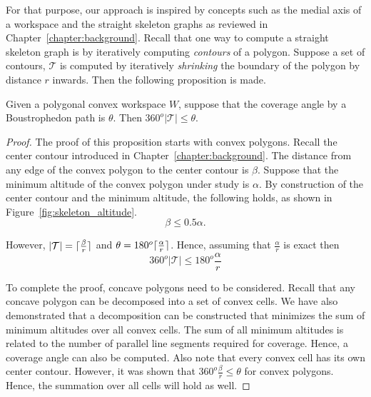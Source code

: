 \documentclass[../main.tex]{subfiles}
\begin{document}
For that purpose, our approach is inspired by concepts such as the medial axis of a workspace and the straight skeleton graphs as reviewed in Chapter~\ref{chapter:background}. Recall that one way to compute a straight skeleton graph is by iteratively computing \emph{contours} of a polygon. Suppose a set of contours, $\mathcal{T}$ is computed by iteratively \emph{shrinking} the boundary of the polygon by distance $r$ inwards. Then the following proposition is made.

\begin{proposition}
	Given a polygonal convex workspace $W$, suppose that the coverage angle by a Boustrophedon path is $\theta$. Then $360^o|\mathcal{T}|\leq\theta$.
\end{proposition}
\begin{proof}

The proof of this proposition starts with convex polygons. Recall the center contour introduced in Chapter~\ref{chapter:background}. The distance from any edge of the convex polygon to the center contour is $\beta$. Suppose that the minimum altitude of the convex polygon under study is $\alpha$. By construction of the center contour and the minimum altitude, the following holds, as shown in Figure~\ref{fig:skeleton_altitude}.
\begin{equation}
	\beta\leq 0.5\alpha.
\end{equation}

However, $|\mathcal{T}|=\lceil\frac{\beta}{r}\rceil$ and $\theta=180^o\lceil\frac{\alpha}{r}\rceil$. Hence, assuming that $\frac{\alpha}{r}$ is exact then
\begin{equation}
 360^o|\mathcal{T}|\leq180^o\frac{\alpha}{r}
 \end{equation}

To complete the proof, concave polygons need to be considered. Recall that any concave polygon can be decomposed into a set of convex cells. We have also demonstrated that a decomposition can be constructed that minimizes the sum of minimum altitudes over all convex cells. The sum of all minimum altitudes is related to the number of parallel line segments required for coverage. Hence, a coverage angle can also be computed. Also note that every convex cell has its own center contour. However, it was shown that $360^o\frac{\beta}{r}\leq\theta$ for convex polygons. Hence, the summation over all cells will hold as well.
\end{proof}
\end{document}
